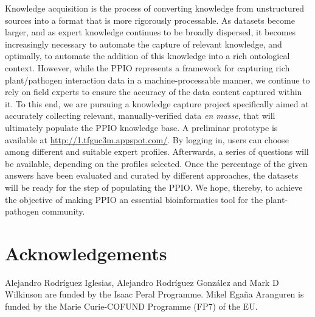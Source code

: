 \documentclass[sw]{iosart2c}
\begin{document}
Knowledge acquisition is the process of converting knowledge from unstructured sources into a format that is more rigorously processable. As datasets become larger, and as expert knowledge continues to be broadly dispersed, it becomes increasingly necessary to automate the capture of relevant knowledge, and optimally, to automate the addition of this knowledge into a rich ontological context. However, while the PPIO represents a framework for capturing rich plant/pathogen interaction data in a machine-processable manner, we continue to rely on field experts to ensure the accuracy of the data content captured within it. To this end, we are pursuing a knowledge capture project specifically aimed at accurately collecting relevant, manually-verified data {\itshape en masse}, that will ultimately populate the PPIO knowledge base. A preliminar prototype is available at \url{http://1.tfguc3m.appspot.com/}. By logging in, users can choose among different and suitable expert profiles. Afterwards, a series of questions will be available, depending on the profiles selected. Once the percentage of the given answers have been evaluated and curated by different approaches, the datasets will be ready for the step of populating the PPIO. We hope, thereby, to achieve the objective of making PPIO an essential bioinformatics tool for the plant-pathogen community.



\section*{Acknowledgements}
Alejandro Rodr\'iguez Iglesias, Alejandro Rodr\'iguez Gonz\'alez and Mark D Wilkinson are funded by the Isaac Peral Programme. Mikel Ega\~na Aranguren is funded by the Marie Curie-COFUND Programme (FP7) of the EU.












  
\end{document}
